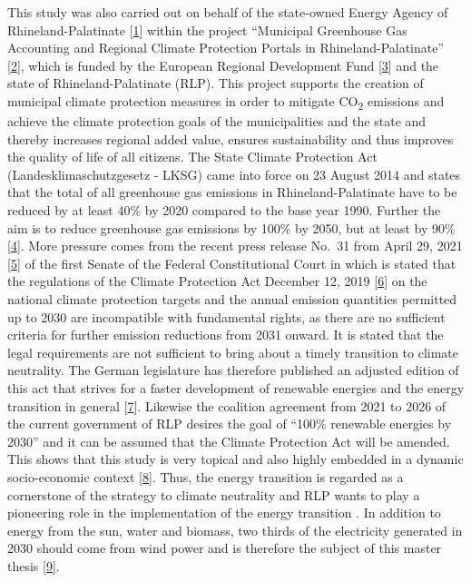 \documentclass[a4paper,11pt]{article}
\begin{document}
This study was also carried out on behalf of the state-owned Energy Agency of Rhineland-Palatinate {[}\protect\hyperlink{ref-EnergieagenturRheinlandPfalz.2021}{1}{]} within the project ``Municipal Greenhouse Gas Accounting and Regional Climate Protection Portals in Rhineland-Palatinate'' {[}\protect\hyperlink{ref-KomBiReK.2021}{2}{]}, which is funded by the European Regional Development Fund {[}\protect\hyperlink{ref-EuropeanRegionalDevelopmentFund.2021}{3}{]} and the state of Rhineland-Palatinate (RLP). This project supports the creation of municipal climate protection measures in order to mitigate CO\textsubscript{2} emissions and achieve the climate protection goals of the municipalities and the state and thereby increases regional added value, ensures sustainability and thus improves the quality of life of all citizens. The State Climate Protection Act (Landesklimaschutzgesetz - LKSG) came into force on 23 August 2014 and states that the total of all greenhouse gas emissions in Rhineland-Palatinate have to be reduced by at least 40\% by 2020 compared to the base year 1990. Further the aim is to reduce greenhouse gas emissions by 100\% by 2050, but at least by 90\% {[}\protect\hyperlink{ref-RheinlandPfalz.19.08.2014}{4}{]}. More pressure comes from the recent press release No.~31 from April 29, 2021 {[}\protect\hyperlink{ref-Bundesverfassungsgericht.24.03.2021}{5}{]} of the first Senate of the Federal Constitutional Court in which is stated that the regulations of the Climate Protection Act December 12, 2019 {[}\protect\hyperlink{ref-BundesamtfurJustiz.2019}{6}{]} on the national climate protection targets and the annual emission quantities permitted up to 2030 are incompatible with fundamental rights, as there are no sufficient criteria for further emission reductions from 2031 onward. It is stated that the legal requirements are not sufficient to bring about a timely transition to climate neutrality. The German legislature has therefore published an adjusted edition of this act that strives for a faster development of renewable energies and the energy transition in general {[}\protect\hyperlink{ref-BundesministeriumfurUmweltNaturschutzundnukleareSicherheit.12.05.2021}{7}{]}. Likewise the coalition agreement from 2021 to 2026 of the current government of RLP desires the goal of ``100\% renewable energies by 2030'' and it can be assumed that the Climate Protection Act will be amended. This shows that this study is very topical and also highly embedded in a dynamic socio-economic context {[}\protect\hyperlink{ref-SPDGruneFDP.2021}{8}{]}. Thus, the energy transition is regarded as a cornerstone of the strategy to climate neutrality and RLP wants to play a pioneering role in the implementation of the energy transition . In addition to energy from the sun, water and biomass, two thirds of the electricity generated in 2030 should come from wind power and is therefore the subject of this master thesis {[}\protect\hyperlink{ref-LandesregierungRheinlandPfalz.2021}{9}{]}.
\end{document}
